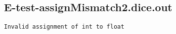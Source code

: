 \subsection{E-test-assignMismatch2.dice.out}
\begin{verbatim}
Invalid assignment of int to float

\end{verbatim}